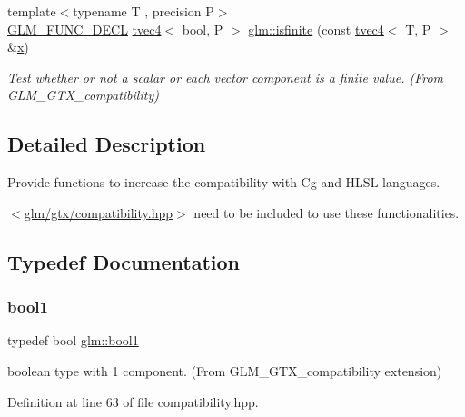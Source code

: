 \begin{DoxyCompactItemize}
{\footnotesize template$<$typename T , precision P$>$ }\\\mbox{\hyperlink{setup_8hpp_ab2d052de21a70539923e9bcbf6e83a51}{G\+L\+M\+\_\+\+F\+U\+N\+C\+\_\+\+D\+E\+CL}} \mbox{\hyperlink{structglm_1_1tvec4}{tvec4}}$<$ bool, P $>$ \mbox{\hyperlink{group__gtx__compatibility_ga8c6a59e2f2ac84fba0c5932f1c35bf7a}{glm\+::isfinite}} (const \mbox{\hyperlink{structglm_1_1tvec4}{tvec4}}$<$ T, P $>$ \&\mbox{\hyperlink{glad_8h_a92d0386e5c19fb81ea88c9f99644ab1d}{x}})
\begin{DoxyCompactList}\small\item\em Test whether or not a scalar or each vector component is a finite value. (From G\+L\+M\+\_\+\+G\+T\+X\+\_\+compatibility) \end{DoxyCompactList}\end{DoxyCompactItemize}


\subsection{Detailed Description}
Provide functions to increase the compatibility with Cg and H\+L\+SL languages. 

$<$\mbox{\hyperlink{compatibility_8hpp}{glm/gtx/compatibility.\+hpp}}$>$ need to be included to use these functionalities. 

\subsection{Typedef Documentation}
\mbox{\label{group__gtx__compatibility_gab65f19f5170f95a2f06d6aa6482c9405}} 
\subsubsection{\texorpdfstring{bool1}{bool1}}
{\footnotesize\ttfamily typedef bool \mbox{\hyperlink{group__gtx__compatibility_gab65f19f5170f95a2f06d6aa6482c9405}{glm\+::bool1}}}



boolean type with 1 component. (From G\+L\+M\+\_\+\+G\+T\+X\+\_\+compatibility extension) 



Definition at line 63 of file compatibility.\+hpp.

\mbox{\label{group__gtx__compatibility_ga98d9d3da22aebc872ba38ce5afa0eff7}} 
